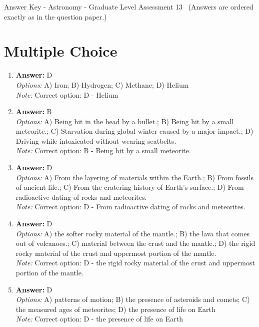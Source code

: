 \documentclass[12pt]{article}
\begin{document}
\begin{center}
Answer Key - Astronomy - Graduate Level Assessment 13 \
\small (Answers are ordered exactly as in the question paper.)
\end{center}

\section*{Multiple Choice}
\begin{enumerate}[label=\arabic*.]
\item \textbf{Answer:} D
\\ \textit{Options:} A) Iron; B) Hydrogen; C) Methane; D) Helium
\\ \textit{Note:} Correct option: D - Helium
\item \textbf{Answer:} B
\\ \textit{Options:} A) Being hit in the head by a bullet.; B) Being hit by a small meteorite.; C) Starvation during global winter caused by a major impact.; D) Driving while intoxicated without wearing seatbelts.
\\ \textit{Note:} Correct option: B - Being hit by a small meteorite.
\item \textbf{Answer:} D
\\ \textit{Options:} A) From the layering of materials within the Earth.; B) From fossils of ancient life.; C) From the cratering history of Earth's surface.; D) From radioactive dating of rocks and meteorites.
\\ \textit{Note:} Correct option: D - From radioactive dating of rocks and meteorites.
\item \textbf{Answer:} D
\\ \textit{Options:} A) the softer rocky material of the mantle.; B) the lava that comes out of volcanoes.; C) material between the crust and the mantle.; D) the rigid rocky material of the crust and uppermost portion of the mantle.
\\ \textit{Note:} Correct option: D - the rigid rocky material of the crust and uppermost portion of the mantle.
\item \textbf{Answer:} D
\\ \textit{Options:} A) patterns of motion; B) the presence of asteroids and comets; C) the measured ages of meteorites; D) the presence of life on Earth
\\ \textit{Note:} Correct option: D - the presence of life on Earth
\end{enumerate}
\end{document}
